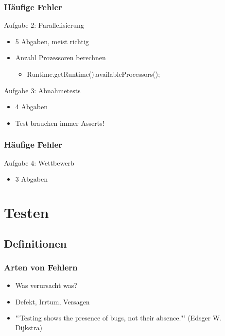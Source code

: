 \documentclass[18pt]{beamer}
\begin{document}
	\begin{frame}
		\frametitle{Häufige Fehler}
		\begin{block}{Aufgabe 2: Parallelisierung}
			\begin{itemize}
				\item 5 Abgaben, meist richtig \pause
				\item Anzahl Prozessoren berechnen
				\begin{itemize}
					\item Runtime.getRuntime().availableProcessors();
				\end{itemize}
			\end{itemize}
			\end{block}
		\pause 
		\begin{block}{Aufgabe 3: Abnahmetests}
			\begin{itemize}
				\item 4 Abgaben
				\item Test brauchen immer Asserts!
			\end{itemize}
		\end{block}
	\end{frame}

	\begin{frame}
		\frametitle{Häufige Fehler}
		\begin{block}{Aufgabe 4: Wettbewerb}
			\begin{itemize}
				\item 3 Abgaben
			\end{itemize}
		\end{block}
	\end{frame}
		
\section{Testen}
	\subsection{Definitionen}
	
	\begin{frame}
		\frametitle{Arten von Fehlern}
		\begin{itemize}
			\item Was verursacht was?
			\item Defekt, Irrtum, Versagen \pause
			\item "'Testing shows the presence of bugs, not their absence."' (Edsger W. Dijkstra)
		\end{itemize}
	\end{frame}
\end{document}
